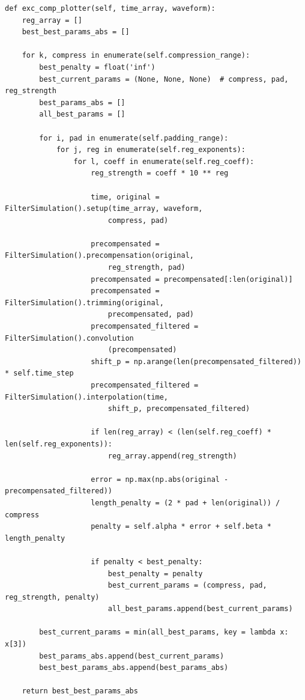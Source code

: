 \documentclass[11pt, a4paper]{article}
\theoremstyle{definition}
\numberwithin{equation}{section}
\begin{document}
\begin{verbatim}
def exc_comp_plotter(self, time_array, waveform):
    reg_array = []
    best_best_params_abs = []

    for k, compress in enumerate(self.compression_range):
        best_penalty = float('inf')
        best_current_params = (None, None, None)  # compress, pad, reg_strength
        best_params_abs = []
        all_best_params = []
        
        for i, pad in enumerate(self.padding_range):
            for j, reg in enumerate(self.reg_exponents):
                for l, coeff in enumerate(self.reg_coeff):
                    reg_strength = coeff * 10 ** reg

                    time, original = FilterSimulation().setup(time_array, waveform,
                        compress, pad)

                    precompensated = FilterSimulation().precompensation(original, 
                        reg_strength, pad)
                    precompensated = precompensated[:len(original)]
                    precompensated = FilterSimulation().trimming(original, 
                        precompensated, pad)
                    precompensated_filtered = FilterSimulation().convolution
                        (precompensated)
                    shift_p = np.arange(len(precompensated_filtered)) * self.time_step
                    precompensated_filtered = FilterSimulation().interpolation(time, 
                        shift_p, precompensated_filtered)

                    if len(reg_array) < (len(self.reg_coeff) * len(self.reg_exponents)):
                        reg_array.append(reg_strength)

                    error = np.max(np.abs(original - precompensated_filtered))
                    length_penalty = (2 * pad + len(original)) / compress
                    penalty = self.alpha * error + self.beta * length_penalty

                    if penalty < best_penalty:
                        best_penalty = penalty
                        best_current_params = (compress, pad, reg_strength, penalty)
                        all_best_params.append(best_current_params)

        best_current_params = min(all_best_params, key = lambda x: x[3])
        best_params_abs.append(best_current_params)
        best_best_params_abs.append(best_params_abs)

    return best_best_params_abs
\end{verbatim}
\end{document}
